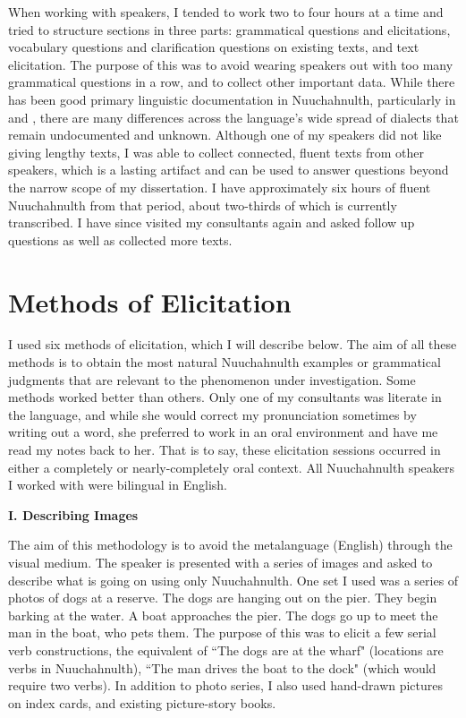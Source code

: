 When working with speakers, I tended to work two to four hours at a time and tried to structure sections in three parts: grammatical questions and elicitations, vocabulary questions and clarification questions on existing texts, and text elicitation. The purpose of this was to avoid wearing speakers out with too many grammatical questions in a row, and to collect other important data. While there has been good primary linguistic documentation in Nuuchahnulth, particularly in \cite{sapir1939} and \cite{rose1981}, there are many differences across the language's wide spread of dialects that remain undocumented and unknown. Although one of my speakers did not like giving lengthy texts, I was able to collect connected, fluent texts from other speakers, which is a lasting artifact and can be used to answer questions beyond the narrow scope of my dissertation. I have approximately six hours of fluent Nuuchahnulth from that period, about two-thirds of which is currently transcribed. I have since visited my consultants again and asked follow up questions as well as collected more texts.

\section{Methods of Elicitation}

I used six methods of elicitation, which I will describe below. The aim of all these methods is to obtain the most natural Nuuchahnulth examples or grammatical judgments that are relevant to the phenomenon under investigation. Some methods worked better than others. Only one of my consultants was literate in the language, and while she would correct my pronunciation sometimes by writing out a word, she preferred to work in an oral environment and have me read my notes back to her. That is to say, these elicitation sessions occurred in either a completely or nearly-completely oral context. All Nuuchahnulth speakers I worked with were bilingual in English.

\vspace{8pt}

\noindent \textbf{I. Describing Images}

The aim of this methodology is to avoid the metalanguage (English) through the visual medium. The speaker is presented with a series of images and asked to describe what is going on using only Nuuchahnulth. One set I used was a series of photos of dogs at a reserve. The dogs are hanging out on the pier. They begin barking at the water. A boat approaches the pier. The dogs go up to meet the man in the boat, who pets them. The purpose of this was to elicit a few serial verb constructions, the equivalent of ``The dogs are at the wharf" (locations are verbs in Nuuchahnulth), ``The man drives the boat to the dock" (which would require two verbs). In addition to photo series, I also used hand-drawn pictures on index cards, and existing picture-story books.


